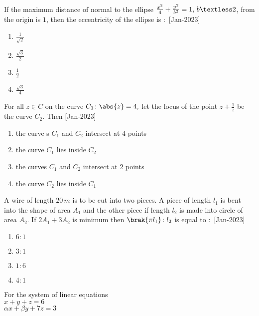  \iffalse
    \title{2023}
    \author{EE24BTECH11021}
    \section{mcq-single}
\fi
    \item If the maximum distance of  normal to the ellipse $\frac{x^2}{4}+\frac{y^2}{b^2}=1,\,b\textless 2$, from the origin is $1$, then the eccentricity of the ellipse is $\colon$
    \hfill{[Jan-2023]}
        \begin{enumerate}
            \item $\frac{1}{\sqrt{2}}$
            \item $\frac{\sqrt{3}}{2}$
            \item $\frac{1}{2}$
            \item $\frac{\sqrt{3}}{4}$
        \end{enumerate}
    \item For all $z\in C$ on the curve $C_1\colon\abs{z}=4,$ let the locus of the point $z+\frac{1}{z}$ be the curve $C_2$. Then 
    \hfill{[Jan-2023]}
        \begin{enumerate}
            \item the curve s $C_1$ and  $C_2$ intersect at $4$ points
            \item the curve $C_1$ lies inside $C_2$
            \item the curves $C_1$ and $C_2$ intersect at $2$ points
            \item the curve $C_2$ lies inside $C_1$ 
        \end{enumerate}
    \item A wire of length $20\,m$ is to be cut into two pieces. A piece of length $l_1$ is bent into the shape of area $A_1$ and the other piece if length $l_2$ is made into circle of area $A_2$. If $2A_1+3A_2$ is minimum then $\brak{\pi l_1}\colon l_2$ is equal to $\colon$
    \hfill{[Jan-2023]}
        \begin{enumerate}
            \item $6\colon1$
            \item $3\colon1$
            \item $1\colon6$
            \item $4\colon1$
        \end{enumerate}
    \item For the system of linear equations\\
            $x+y+z=6$\\
            $\alpha x+\beta y+7z=3$\\
